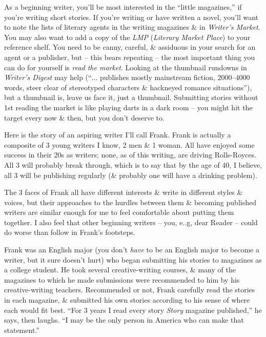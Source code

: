 \documentclass{article}
\numberwithin{equation}{section}
\begin{document}
As a beginning writer, you'll be most interested in the ``little magazines,'' if you're writing short stories. If you're writing or have written a novel, you'll want to note the lists of literary agents in the writing magazines \& in \textit{Writer's Market}. You may also want to add a copy of the \textit{LMP} (\textit{Literary Market Place}) to your reference shelf. You need to be canny, careful, \& assiduous in your search for an agent or a publisher, but -- this bears repeating -- the most important thing you can do for yourself is \textit{read the market}. Looking at the thumbnail rundowns in \textit{Writer's Digest} may help (``$\ldots$ publishes mostly mainstream fiction, 2000--4000 words, steer clear of stereotyped characters \& hackneyed romance situations''), but a thumbnail is, leave us face it, just a thumbnail. Submitting stories without 1st reading the market is like playing darts in a dark room -- you might hit the target every now \& then, but you don't deserve to.

Here is the story of an aspiring writer I'll call Frank. Frank is actually a composite of 3 young writers I know, 2 men \& 1 woman. All have enjoyed some success in their 20s as writers; none, as of this writing, are driving Rolls-Royces. All 3 will probably break through, which is to say that by the age of 40, I believe, all 3 will be publishing regularly (\& probably one will have a drinking problem).

The 3 faces of Frank all have different interests \& write in different styles \& voices, but their approaches to the hurdles between them \& becoming published writers are similar enough for me to feel comfortable about putting them together. I also feel that other beginning writers -- you, e..g, dear Reader -- could do worse than follow in Frank's footsteps.

Frank was an English major (you don't \textit{have} to be an English major to become a writer, but it sure doesn't hurt) who began submitting his stories to magazines as a college student. He took several creative-writing courses, \& many of the magazines to which he made submissions were recommended to him by his creative-writing teachers. Recommended or not, Frank carefully read the stories in each magazine, \& submitted his own stories according to his sense of where each would fit best. ``For 3 years I read every story \textit{Story} magazine published,'' he says, then laughs. ``I may be the only person in America who can make that statement.''
\end{document}
